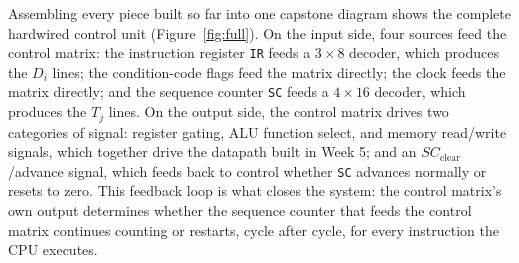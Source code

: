 \documentclass[11pt]{article}
\begin{document}
Assembling every piece built so far into one capstone diagram shows the complete hardwired control unit (Figure~\ref{fig:full}). On the input side, four sources feed the control matrix: the instruction register \texttt{IR} feeds a $3{\times}8$ decoder, which produces the $D_i$ lines; the condition-code flags feed the matrix directly; the clock feeds the matrix directly; and the sequence counter \texttt{SC} feeds a $4{\times}16$ decoder, which produces the $T_j$ lines. On the output side, the control matrix drives two categories of signal: register gating, ALU function select, and memory read/write signals, which together drive the datapath built in Week 5; and an $SC_{\text{clear}}$/advance signal, which feeds back to control whether \texttt{SC} advances normally or resets to zero. This feedback loop is what closes the system: the control matrix's own output determines whether the sequence counter that feeds the control matrix continues counting or restarts, cycle after cycle, for every instruction the CPU executes.
\end{document}
